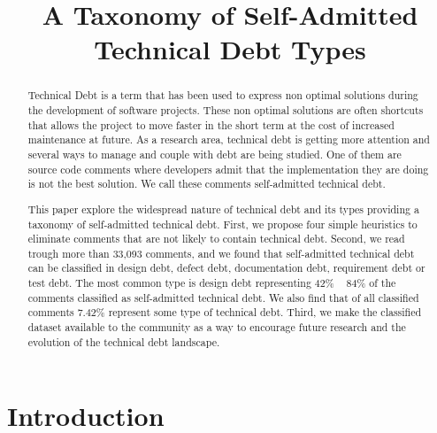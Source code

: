 \documentclass[conference]{IEEEtran}
\begin{document}
\title{A Taxonomy of Self-Admitted Technical Debt Types}

\author{

}

\maketitle

\begin{abstract} Technical Debt is a term that has been used to express non optimal solutions during the development of software projects. These non optimal solutions are often shortcuts that allows the project to move faster in the short term at the cost of increased maintenance at future. As a research area, technical debt is getting more attention and several ways to manage and couple with debt are being studied. One of them are source code comments where developers admit that the implementation they are doing is not the best solution. We call these comments self-admitted technical debt. 
	
This paper explore the widespread nature of technical debt and its types providing a taxonomy of self-admitted technical debt. First, we propose four simple heuristics to eliminate comments that are not likely to contain technical debt. Second, we read trough more than 33,093 comments, and we found that self-admitted technical debt can be classified in design debt, defect debt, documentation debt, requirement debt or test debt. The  most common type is design debt representing 42\% ~ 84\% of the comments classified as self-admitted technical debt. We also find that of all classified comments 7.42\% represent some type of technical debt. Third, we make the classified dataset available to the community as a way to encourage future research and the evolution of the technical debt landscape. 
	
\end{abstract}

\IEEEpeerreviewmaketitle

\section{Introduction}
\label{sec:introduction}

\end{document}
